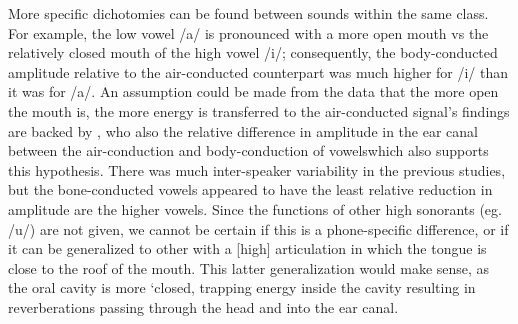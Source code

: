 More specific dichotomies can be found between sounds within the same class. For example, the low vowel /a/ is pronounced with a more open mouth vs the relatively closed mouth of the high vowel /i/; consequently, the body-conducted amplitude relative to the air-conducted counterpart was much higher for /i/ than it was for /a/. An assumption could be made from the data that the more open the mouth is, the more energy is transferred to the air-conducted signal\DIFdelbegin {}\DIFdelend \DIFaddbegin {}\DIFaddend \cite{reinfeldt:10}'s findings are backed by \cite{bekesy:60}, who also \DIFdelbegin {}\DIFdelend \DIFaddbegin {}\DIFaddend the relative difference in amplitude in the ear canal between the air-conduction and body-conduction of vowels\DIFdelbegin {}\DIFdelend \DIFaddbegin \DIFadd{, %
}\DIFaddend which also supports this hypothesis.  There was much inter-speaker variability in the previous studies, but the bone-conducted vowels appeared to have the least relative reduction in amplitude are the higher vowels.  Since the functions of other high sonorants (eg. /u/) are not given, we cannot be certain if this is a phone-specific difference, or if it can be generalized to other \DIFdelbegin {}\DIFdelend \DIFaddbegin {}\DIFaddend with a [high] articulation in which the tongue is close to the roof of the mouth.  This latter generalization would make sense, as the oral cavity is more `closed\DIFaddbegin {}\DIFaddend , trapping energy inside the cavity resulting in \DIFdelbegin {}\DIFdelend \DIFaddbegin {}\DIFaddend reverberations passing through the head and into the ear canal.
%
\DIFdelbegin %
{%
}
